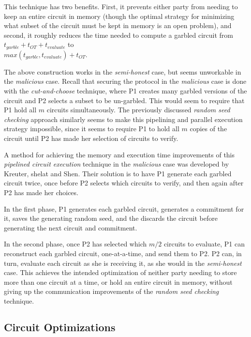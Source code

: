 This technique has two benefits.  First, it prevents either party from needing to keep an entire circuit in memory (though the optimal strategy for minimizing what subset of the circuit must be kept in memory is an open problem\cite{kreuter2012billion}), and second, it roughly reduces the time needed to compute a garbled circuit from $t_{garble} + t_{OT} + t_{evaluate}$ to\\ $max(t_{garble}, t_{evaluate}) + t_{OT}$.

The above construction works in the \emph{semi-honest} case, but seems unworkable in the \emph{malicious} case.  Recall that securing the protocol in the \emph{malicious} case is done with the \emph{cut-and-choose} technique, where \ac{P1} creates many garbled versions of the circuit and \ac{P2} selects a subset to be un-garbled.  This would seem to require that \ac{P1} hold all $m$ circuits simultaneously.  The previously discussed \emph{random seed checking} approach similarly seems to make this pipelining and parallel execution strategy impossible, since it seems to require \ac{P1} to hold all $m$ copies of the circuit until \ac{P2} has made her selection of circuits to verify.

A method for achieving the memory and execution time improvements of this \emph{pipelined circuit execution} technique in the \emph{malicious} case was developed by Kreuter, shelat and Shen\cite{kreuter2012billion}. Their solution is to have \ac{P1} generate each garbled circuit twice, once before \ac{P2} selects which circuits to verify, and then again after \ac{P2} has made her choices.

In the first phase, \ac{P1} generates each garbled circuit, generates a commitment for it, saves the generating random seed, and the discards the circuit before generating the next circuit and commitment.

In the second phase, once \ac{P2} has selected which $m/2$ circuits to evaluate, \ac{P1} can reconstruct each garbled circuit, one-at-a-time, and send them to \ac{P2}.  \ac{P2} can, in turn, evaluate each circuit as she is receiving it, as she would in the \emph{semi-honest} case.  This achieves the intended optimization of neither party needing to store more than one circuit at a time, or hold an entire circuit in memory, without giving up the communication improvements of the \emph{random seed checking} technique.


\subsection{Circuit Optimizations}

